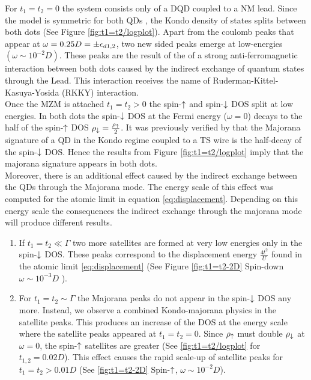 \documentclass[showpacs,aps,prb,reprint,superscriptaddress]{revtex4-1}
\begin{document}
For $t_1 =t_2 = 0$ the system consists only of a DQD coupled to a NM lead. Since the model is symmetric for both QDs , the Kondo density of states  splits between both dots (See Figure \ref{fig:t1=t2/logplot}). Apart from the coulomb peaks that appear at $\omega=0.25D=\pm \epsilon_{d1,2}$, two new sided peaks emerge at low-energies $(\omega \sim 10^{-2}D)$. These peaks are the result of the of a strong anti-ferromagnetic interaction between both dots caused by the indirect exchange of quantum states through the Lead. This interaction receives the name of Ruderman-Kittel-Kasuya-Yosida (RKKY) interaction\cite{ruderman_indirect_1954,kasuya_theory_1956,yosida_magnetic_1957}. \\
    
    

Once the MZM is attached $t_1 =t_2 > 0$ the spin-$\uparrow$ and spin-$\downarrow$ DOS split at low energies. In both dots the spin-$\downarrow$ DOS at the Fermi energy ($\omega =0$) decays to the half of the spin-$\uparrow$ DOS $\rho_\downarrow = \frac{\rho_\uparrow}{2} $. It was previously verified  by  \citeauthor{ruiz-tijerina_interaction_2015} that the Majorana signature of a QD in the Kondo regime coupled to a TS wire is the half-decay of the spin-$\downarrow$ DOS. Hence the results from Figure \ref{fig:t1=t2/logplot} imply that the majorana signature appears in both dots. \\
    
Moreover, there is an additional effect caused by the indirect exchange between the QDs through the Majorana mode. The energy scale of this effect was computed for the atomic limit in equation \eqref{eq:displacement}. Depending on this energy scale the consequences the indirect exchange through the majorana mode will produce different results.

    
\begin{enumerate}
    \item If $t_1=t_2 \ll \Gamma $ two more satellites are formed at very low energies only in the spin-$\downarrow$ DOS. These peaks correspond to the displacement energy $\frac{4t^2}{U}$ found in the atomic limit \eqref{eq:displacement}  (See Figure \ref{fig:t1=t2-2D} Spin-down $\omega \sim 10^{-3}D$ ). 
    \item For $t_1=t_2 \sim \Gamma$ the Majorana peaks do not appear in the spin-$\downarrow$ DOS any more. Instead, we observe a combined Kondo-majorana physics in the satellite peaks. This produces an increase of the DOS at the energy scale where the satellite peaks appeared at $t_1=t_2=0$. Since $\rho_\uparrow$ must double $\rho_\downarrow$ at $\omega=0$, the spin-$\uparrow$ satellites are greater (See  \ref{fig:t1=t2/logplot} for $t_{1,2}=0.02D$). This effect causes the rapid scale-up of satellite peaks for $t_1=t_2>0.01D$  (See \ref{fig:t1=t2-2D} Spin-$\uparrow$, $\omega \sim 10^{-2}D$).
    
\end{enumerate}
    
\end{document}
